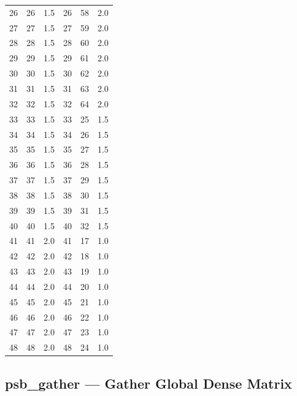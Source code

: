 \begin{table}
\begin{center}
\begin{tabular}{rrr@{\hspace{6\tabcolsep}}rrr}
 26   &   26  &  1.5   &  26  &  58  &   2.0 \\
 27   &   27  &  1.5   &  27  &  59  &   2.0 \\
 28   &   28  &  1.5   &  28  &  60  &   2.0 \\
 29   &   29  &  1.5   &  29  &  61  &   2.0 \\
 30   &   30  &  1.5   &  30  &  62  &   2.0 \\
 31   &   31  &  1.5   &  31  &  63  &   2.0 \\
 32   &   32  &  1.5   &  32  &  64  &   2.0 \\
 33   &   33  &  1.5   &  33  &  25  &   1.5 \\
 34   &   34  &  1.5   &  34  &  26  &   1.5 \\
 35   &   35  &  1.5   &  35  &  27  &   1.5 \\
 36   &   36  &  1.5   &  36  &  28  &   1.5 \\
 37   &   37  &  1.5   &  37  &  29  &   1.5 \\
 38   &   38  &  1.5   &  38  &  30  &   1.5 \\
 39   &   39  &  1.5   &  39  &  31  &   1.5 \\
 40   &   40  &  1.5   &  40  &  32  &   1.5 \\
 41   &   41  &  2.0   &  41  &  17  &   1.0 \\
 42   &   42  &  2.0   &  42  &  18  &   1.0 \\
 43   &   43  &  2.0   &  43  &  19  &   1.0 \\
 44   &   44  &  2.0   &  44  &  20  &   1.0 \\
 45   &   45  &  2.0   &  45  &  21  &   1.0 \\
 46   &   46  &  2.0   &  46  &  22  &   1.0 \\
 47   &   47  &  2.0   &  47  &  23  &   1.0 \\
 48   &   48  &  2.0   &  48  &  24  &   1.0 \\
\end{tabular}
\end{center}
\end{table}



%
%

\clearpage\subsection{psb\_gather --- Gather Global Dense Matrix}

